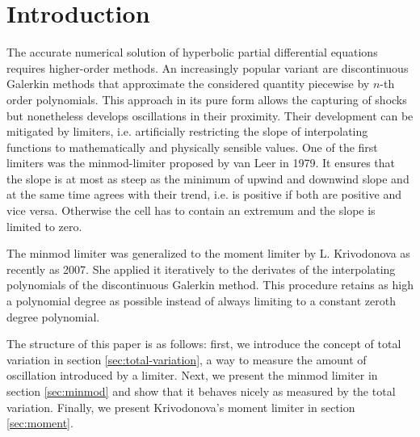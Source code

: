\section{Introduction}

The accurate numerical solution of hyperbolic partial differential equations requires higher-order methods.
An increasingly popular variant are discontinuous Galerkin methods that approximate the considered quantity piecewise by $n$-th order polynomials.
This approach in its pure form allows the capturing of shocks but nonetheless develops oscillations in their proximity.
Their development can be mitigated by limiters, i.e. artificially restricting the slope of interpolating functions to mathematically and physically sensible values.
One of the first limiters was the minmod-limiter\cite{VanLeer1979} proposed by van Leer in 1979.
It ensures that the slope is at most as steep as the minimum of upwind and downwind slope and at the same time agrees with their trend, i.e. is positive if both are positive and vice versa.
Otherwise the cell has to contain an extremum and the slope is limited to zero.

The minmod limiter was generalized to the moment limiter\cite{Krivodonova} by L. Krivodonova as recently as 2007.
She applied it iteratively to the derivates of the interpolating polynomials of the discontinuous Galerkin method.
This procedure retains as high a polynomial degree as possible instead of always limiting to a constant zeroth degree polynomial.

The structure of this paper is as follows: first, we introduce the concept of total variation in section \ref{sec:total-variation}, a way to measure the amount of oscillation introduced by a limiter.
Next, we present the minmod limiter in section \ref{sec:minmod} and show that it behaves nicely as measured by the total variation.
Finally, we present Krivodonova's moment limiter in section \ref{sec:moment}.
